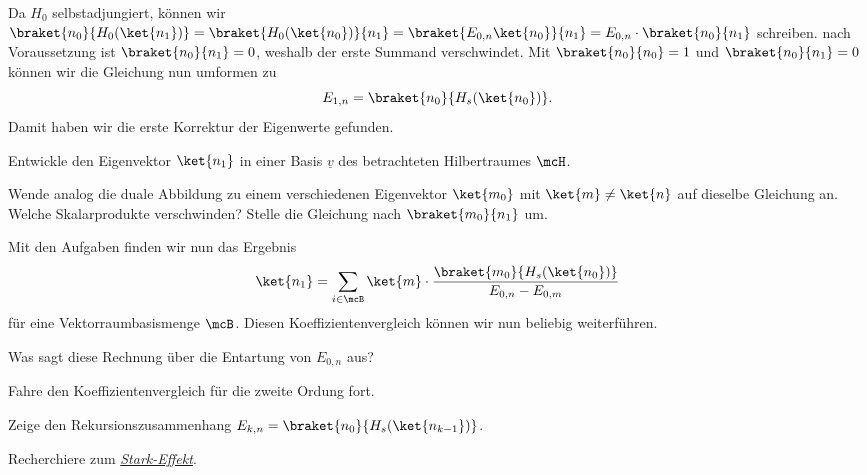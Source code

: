 \documentclass{subfile}
\begin{document}
            Da $H_0$ selbstadjungiert, können wir $\braket{n_0}{H_0(\ket{n_1})} = \braket{H_0(\ket{n_0})}{n_1} = \braket{E_{0,n}\ket{n_0}}{n_1} = E_{0,n}\cdot\braket{n_0}{n_1}$ schreiben. nach Voraussetzung ist $\braket{n_0}{n_1} = 0$, weshalb der erste Summand verschwindet. Mit $\braket{n_0}{n_0} = 1$ und $\braket{n_0}{n_1} = 0$ können wir die Gleichung nun umformen zu
            \[
                E_{1,n} = \braket{n_0}{H_s(\ket{n_0})}.
            \]
            Damit haben wir die erste Korrektur der Eigenwerte gefunden. 
            \begin{Aufgabe}
                \nr{} Entwickle den Eigenvektor $\ket{n_1}$ in einer Basis $\underline v$ des betrachteten Hilbertraumes $\mcH$. 

                \nr{} Wende analog die duale Abbildung zu einem verschiedenen Eigenvektor $\ket{m_0}$ mit $\ket{m}\neq\ket{n}$ auf dieselbe Gleichung an. Welche Skalarprodukte verschwinden? Stelle die Gleichung nach $\braket{m_0}{n_1}$ um. 
            \end{Aufgabe}
            \noindent Mit den Aufgaben finden wir nun das Ergebnis
            \[
                \ket{n_1} = \sum_{i\in\mcB}\ket{m}\cdot \frac{\braket{m_0}{H_s(\ket{n_0})}}{E_{0,n} - E_{0,m}}
            \]
            für eine Vektorraumbasismenge $\mcB$. 
            Diesen Koeffizientenvergleich können wir nun beliebig weiterführen. 
            \begin{Aufgabe}
                \nr{} Was sagt diese Rechnung über die Entartung von $E_{0,n}$ aus?

                \nr{} Fahre den Koeffizientenvergleich für die zweite Ordung fort. 

                \nr{} Zeige den Rekursionszusammenhang $E_{k,n} = \braket{n_0}{H_s(\ket{n_{k-1}})}$. 

                \nr{} Recherchiere zum \href{https://de.wikipedia.org/wiki/Stark-Effekt}{\emph{Stark-Effekt}}.
            \end{Aufgabe}
            
\end{document}
